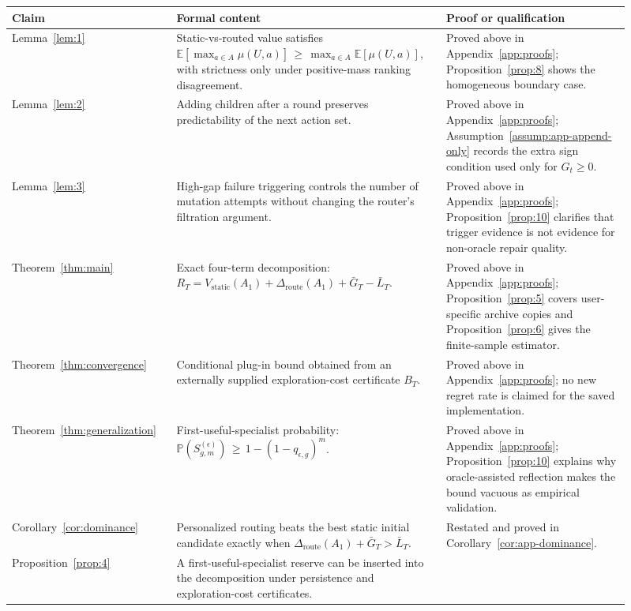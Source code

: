 \documentclass{article} %
\begin{document}
\begin{table}[h]
\centering
\small
\begin{tabular}{p{0.24\linewidth}p{0.39\linewidth}p{0.28\linewidth}}
\toprule
Claim & Formal content & Proof or qualification \\
\midrule
Lemma~\ref{lem:1} &
Static-vs-routed value satisfies
\(\mathbb{E}[\max_{a\in A}\mu(U,a)]\,\ge\, \max_{a\in A}\mathbb{E}[\mu(U,a)]\), with strictness only under positive-mass ranking disagreement. &
Proved above in Appendix~\ref{app:proofs}; Proposition~\ref{prop:8} shows the homogeneous boundary case. \\
\midrule
Lemma~\ref{lem:2} &
Adding children after a round preserves predictability of the next action set. &
Proved above in Appendix~\ref{app:proofs}; Assumption~\ref{assump:app-append-only} records the extra sign condition used only for \(G_t\ge 0\). \\
\midrule
Lemma~\ref{lem:3} &
High-gap failure triggering controls the number of mutation attempts without changing the router's filtration argument. &
Proved above in Appendix~\ref{app:proofs}; Proposition~\ref{prop:10} clarifies that trigger evidence is not evidence for non-oracle repair quality. \\
\midrule
Theorem~\ref{thm:main} &
Exact four-term decomposition:
\(R_T=V_{\mathrm{static}}(A_1)+\Delta_{\mathrm{route}}(A_1)+\bar G_T-\bar L_T\). &
Proved above in Appendix~\ref{app:proofs}; Proposition~\ref{prop:5} covers user-specific archive copies and Proposition~\ref{prop:6} gives the finite-sample estimator. \\
\midrule
Theorem~\ref{thm:convergence} &
Conditional plug-in bound obtained from an externally supplied exploration-cost certificate \(B_T\). &
Proved above in Appendix~\ref{app:proofs}; no new regret rate is claimed for the saved implementation. \\
\midrule
Theorem~\ref{thm:generalization} &
First-useful-specialist probability:
\(\mathbb{P}(S_{g,m}^{(\epsilon)})\,\ge\, 1-(1-q_{\epsilon,g})^m\). &
Proved above in Appendix~\ref{app:proofs}; Proposition~\ref{prop:10} explains why oracle-assisted reflection makes the bound vacuous as empirical validation. \\
\midrule
Corollary~\ref{cor:dominance} &
Personalized routing beats the best static initial candidate exactly when
\(\Delta_{\mathrm{route}}(A_1)+\bar G_T>\bar L_T\). &
Restated and proved in Corollary~\ref{cor:app-dominance}. \\
\midrule
Proposition~\ref{prop:4} &
A first-useful-specialist reserve can be inserted into the decomposition under persistence and exploration-cost certificates. &

\end{tabular}
\end{table}
\end{document}
